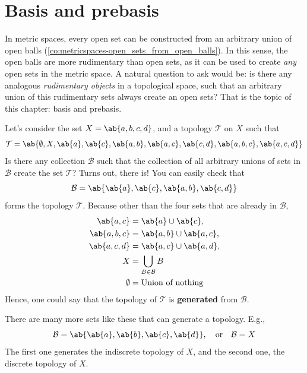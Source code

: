 \section{Basis and prebasis}

In metric spaces, every open set can be constructed from an arbitrary union of open
balls (\cref{co:metricspaces-open_sets_from_open_balls}). In this sense, the open
balls are more rudimentary than open sets, as it can be used to create \emph{any} open
sets in the metric space. A natural question to ask would be: is there any analogous
\emph{rudimentary objects} in a topological space, such that an arbitrary union of this
rudimentary sets always create an open sets? That is the topic of this chapter: basis and prebasis.

Let's consider the set \(X = \ab\{a, b, c, d\}\), and a topology \(\mathcal{T}\) on \(X\) such that
\begin{equation}
  \mathcal{T} = \ab\{\emptyset, X, \ab\{a\}, \ab\{c\}, \ab\{a, b\}, \ab\{a, c\}, \ab\{c, d\}, \ab\{a, b, c\}, \ab\{a, c, d\}\}
\end{equation}
Is there any collection \(\mathcal{B}\) such that the collection of all arbitrary unions of sets
in \(\mathcal{B}\) create the set \(\mathcal{T}\)? Turns out, there is! You can easily check that
\begin{equation}
  \mathcal{B} = \ab\{\ab\{a\}, \ab\{c\}, \ab\{a, b\}, \ab\{c, d\}\}
\end{equation}
forms the topology \(\mathcal{T}\). Because other than the four sets that are already
in \(\mathcal{B}\),
\begin{equation}
  \begin{aligned}
    \ab\{a, c\}    & = \ab\{a\} \cup \ab\{c\},       \\
    \ab\{a, b, c\} & = \ab\{a, b\} \cup \ab\{a, c\}, \\
    \ab\{a, c, d\} & = \ab\{a, c\} \cup \ab\{a, d\}, \\
    X              & = \bigcup_{B \in \mathcal{B}} B \\
    \emptyset      & = \textrm{Union of nothing}
  \end{aligned}
\end{equation}
Hence, one could say that the topology of \(\mathcal{T}\) is \textbf{generated} from
\(\mathcal{B}\).

There are many more sets like these that can generate a topology. E.g.,
\begin{equation}
  \mathcal{B} = \ab\{\ab\{a\}, \ab\{b\}, \ab\{c\}, \ab\{d\}\}, \mathor \mathcal{B} = X
\end{equation}
The first one generates the indiscrete topology of \(X\), and the second one, the
discrete topology of \(X\).

